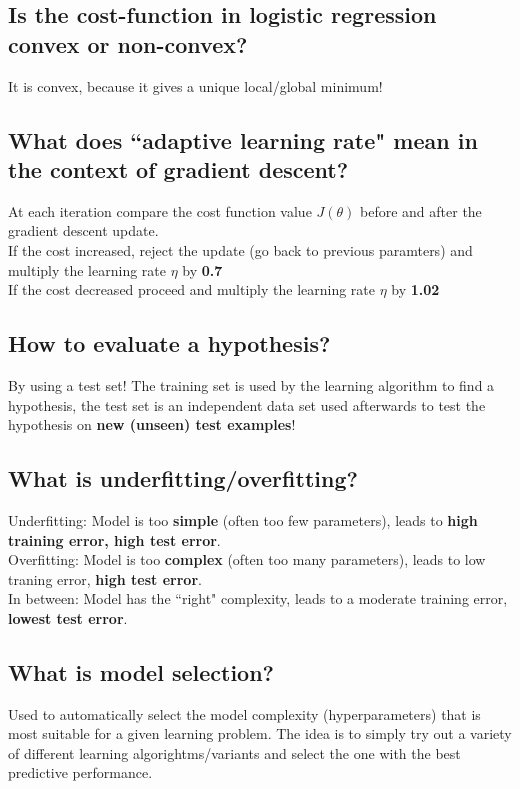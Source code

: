 \documentclass[12pt]{scrartcl}
\begin{document}
\subsection{Is the cost-function in logistic regression convex or non-convex?}
It is convex, because it gives a unique local/global minimum!

\subsection{What does ``adaptive learning rate" mean in the context of gradient descent?}
At each iteration compare the cost function value $J(\theta)$ before and after the gradient descent update. \\
If the cost increased, reject the update (go back to previous paramters) and multiply the learning rate $\eta$ by {\bf 0.7} \\
If the cost decreased proceed and multiply the learning rate $\eta$ by {\bf 1.02}

\subsection{How to evaluate a hypothesis?}
\label{traintest}By using a test set! The training set is used by the learning algorithm to find a hypothesis, the test set is an independent data set used afterwards to test the hypothesis on {\bf new (unseen) test examples}!

\subsection{What is underfitting/overfitting?}
Underfitting: Model is too {\bf simple} (often too few parameters), leads to {\bf high training error, high test error}. \\
Overfitting: Model is too {\bf complex} (often too many parameters), leads to low traning error, {\bf high test error}. \\
In between: Model has the ``right" complexity, leads to a moderate training error, {\bf lowest test error}.

\subsection{What is model selection?}
\label{model1}Used to automatically select the model complexity (hyperparameters) that is most suitable for a given learning problem. The idea is to simply try out a variety of different learning algorightms/variants and select the one with the best predictive performance.
\end{document}
